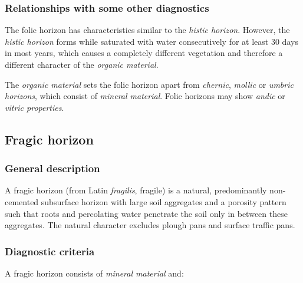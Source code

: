 \documentclass[
  letterpaper,
  DIV=11,
  numbers=noendperiod]{scrreprt}
\begin{document}
\hypertarget{relationships-with-some-other-diagnostics-11}{%
\subsubsection{Relationships with some other
diagnostics}\label{relationships-with-some-other-diagnostics-11}}

The folic horizon has characteristics similar to the \emph{histic
horizon}. However, the \emph{histic horizon} forms while saturated with
water consecutively for at least 30 days in most years, which causes a
completely different vegetation and therefore a different character of
the \emph{organic material}.

The \emph{organic material} sets the folic horizon apart from
\emph{chernic}, \emph{mollic} or \emph{umbric horizons}, which consist
of \emph{mineral material}. Folic horizons may show \emph{andic} or
\emph{vitric properties}.

\hypertarget{fragic-horizon}{%
\subsection{Fragic horizon}\label{fragic-horizon}}

\hypertarget{general-description-12}{%
\subsubsection{General description}\label{general-description-12}}

A fragic horizon (from Latin \emph{fragilis}, fragile) is a natural,
predominantly non-cemented subsurface horizon with large soil aggregates
and a porosity pattern such that roots and percolating water penetrate
the soil only in between these aggregates. The natural character
excludes plough pans and surface traffic pans.

\hypertarget{diagnostic-criteria-12}{%
\subsubsection{Diagnostic criteria}\label{diagnostic-criteria-12}}

A fragic horizon consists of \emph{mineral material} and:
\end{document}
